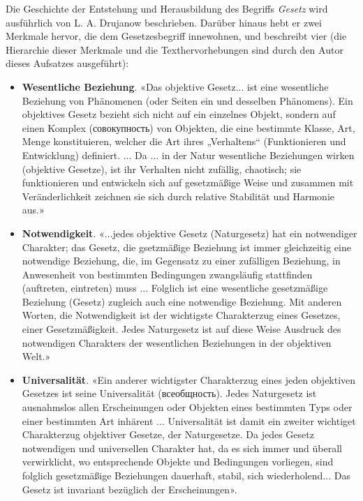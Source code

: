 \documentclass[11pt,a4paper]{article}
\begin{document}
Die Geschichte der Entstehung und Herausbildung des Begriffs \emph{Gesetz}
wird ausführlich von L. A. Drujanow beschrieben. Darüber hinaus hebt er zwei
Merkmale hervor, die dem Gesetzesbegriff innewohnen, und beschreibt vier (die
Hierarchie dieser Merkmale und die Texthervorhebungen sind durch den Autor
dieses Aufsatzes ausgeführt):
\begin{itemize}
\item \textbf{Wesentliche Beziehung}. «Das objektive Gesetz... ist eine
  wesentliche Beziehung von Phänomenen (oder Seiten ein und desselben
  Phänomens). Ein objektives Gesetz bezieht sich nicht auf ein einzelnes
  Objekt, sondern auf einen Komplex (\foreignlanguage{russian}{совокупность})
  von Objekten, die eine bestimmte Klasse, Art, Menge konstituieren, welcher
  die Art ihres „Verhaltens“ (Funktionieren und Entwicklung) definiert.
  ... Da ... in der Natur wesentliche Beziehungen wirken (objektive Gesetze),
  ist ihr Verhalten nicht zufällig, chaotisch; sie funktionieren und
  entwickeln sich auf gesetzmäßige Weise und zusammen mit Veränderlichkeit
  zeichnen sie sich durch relative Stabilität und Harmonie aus.»
\item \textbf{Notwendigkeit}. «...jedes objektive Gesetz (Naturgesetz) hat ein
  notwendiger Charakter; das Gesetz, die gsetzmäßige Beziehung ist immer
  gleichzeitig eine notwendige Beziehung, die, im Gegensatz zu einer
  zufälligen Beziehung, in Anwesenheit von bestimmten Bedingungen zwangsläufig
  stattfinden (auftreten, eintreten) muss ...  Folglich ist eine wesentliche
  gesetzmäßige Beziehung (Gesetz) zugleich auch eine notwendige Beziehung.
  Mit anderen Worten, die Notwendigkeit ist der wichtigste Charakterzug eines
  Gesetzes, einer Gesetzmäßigkeit. Jedes Naturgesetz ist auf diese Weise
  Ausdruck des notwendigen Charakters der wesentlichen Beziehungen in
  der objektiven Welt.»
\item \textbf{Universalität}. «Ein anderer wichtigster Charakterzug eines
  jeden objektiven Gesetzes ist seine Universalität
  (\foreignlanguage{russian}{всеобщность}). Jedes Naturgesetz ist ausnahmslos
  allen Erscheinungen oder Objekten eines bestimmten Typs oder einer
  bestimmten Art inhärent ...  Universalität ist damit ein zweiter wichtiget
  Charakterzug objektiver Gesetze, der Naturgesetze.  Da jedes Gesetz
  notwendigen und universellen Charakter hat, da es sich immer und überall
  verwirklicht, wo entsprechende Objekte und Bedingungen vorliegen, sind
  folglich gesetzmäßige Beziehungen dauerhaft, stabil, sich wiederholend...
  Das Gesetz ist invariant bezüglich der Erscheinungen».

\end{itemize}
\end{document}
